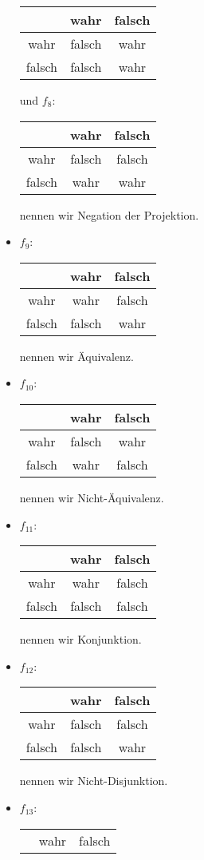 \begin{solution}
\begin{itemize}
\begin{tabular}{|c||c|c|}
\hline
& wahr & falsch \\
\hline
\hline
wahr & falsch & wahr \\
\hline
falsch & falsch & wahr\\
\hline
\end{tabular} und
$f_8$:\quad\begin{tabular}{|c||c|c|}
\hline
& wahr & falsch \\
\hline
\hline
wahr & falsch & falsch \\
\hline
falsch & wahr & wahr\\
\hline
\end{tabular} nennen wir Negation der Projektion.
 \item
 $f_9$:\quad\begin{tabular}{|c||c|c|}
 \hline
 & wahr & falsch \\
 \hline
 \hline
 wahr & wahr & falsch \\
 \hline
 falsch & falsch & wahr\\
 \hline
 \end{tabular} nennen wir Äquivalenz.
 \item
 $f_{10}$:\quad\begin{tabular}{|c||c|c|}
 \hline
 & wahr & falsch \\
 \hline
 \hline
 wahr & falsch & wahr \\
 \hline
 falsch & wahr & falsch\\
 \hline
 \end{tabular} nennen wir Nicht-Äquivalenz.
 \item
 $f_{11}$:\quad\begin{tabular}{|c||c|c|}
 \hline
 & wahr & falsch \\
 \hline
 \hline
 wahr & wahr & falsch \\
 \hline
 falsch & falsch & falsch\\
 \hline
 \end{tabular} nennen wir Konjunktion.
 \item
 $f_{12}$:\quad\begin{tabular}{|c||c|c|}
 \hline
 & wahr & falsch \\
 \hline
 \hline
 wahr & falsch & falsch \\
 \hline
 falsch & falsch & wahr\\
 \hline
 \end{tabular} nennen wir Nicht-Disjunktion.
 \item
 $f_{13}$:\quad\begin{tabular}{|c||c|c|}
 \hline
 & wahr & falsch \\

\end{tabular}
\end{itemize}
\end{solution}
